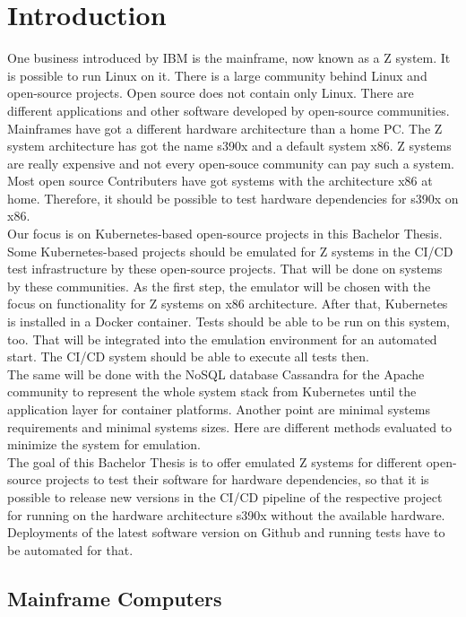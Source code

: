 \chapter{Introduction}\label{ch:intro}

One business introduced by IBM is the mainframe, now known as a Z system. It is possible to run Linux on it. 
There is a large community behind Linux and open-source projects. 
Open source does not contain only Linux. 
There are different applications and other software developed by open-source communities. 
Mainframes have got a different hardware architecture than a home PC. 
The Z system architecture has got the name s390x and a default system x86. 
Z systems are really expensive and not every open-souce community can pay such a system. Most open source Contributers have got systems with the architecture x86 at home. Therefore, it should be possible to test hardware dependencies for s390x on x86. \\
Our focus is on Kubernetes-based open-source projects in this Bachelor Thesis. Some Kubernetes-based projects should be emulated for Z systems in the CI/CD test infrastructure by these open-source projects. That will be done on systems by these communities.
As the first step, the emulator will be chosen with the focus on functionality for Z systems on x86 architecture. 
After that, Kubernetes is installed in a Docker container. 
Tests should be able to be run on this system, too. That will be integrated into the emulation environment for an automated start. The CI/CD system should be able to execute all tests then. \\
The same will be done with the NoSQL database Cassandra for the Apache community to represent the whole system stack from Kubernetes until the application layer for container platforms. Another point are minimal systems requirements and minimal systems sizes. Here are different methods evaluated to minimize the system for emulation. \\
The goal of this Bachelor Thesis is to offer emulated Z systems for different open-source projects to test their software for hardware dependencies, so that it is possible to release new versions in the CI/CD pipeline of the respective project for running on the hardware architecture s390x without the available hardware. Deployments of the latest software version on Github and running tests have to be automated for that.


\section{Mainframe Computers}

